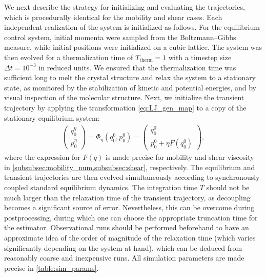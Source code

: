 \documentclass[11pt]{article}
\theoremstyle{definition}
\begin{document}
We next describe the strategy for initializing and evaluating the trajectories, which is procedurally identical for the mobility and shear cases. Each independent realization of the system is initialized as follows. For the equilibrium control system, initial momenta were sampled from the Boltzmann--Gibbs measure, while initial positions were initialized on a cubic lattice. The system was then evolved for a thermalization time of $T_\mathrm{therm} = 1$ with a timestep size $\Delta t=10^{-3}$ in reduced units. We ensured that the thermalization time was sufficient long to melt the crystal structure and relax the system to a stationary state, as monitored by the stabilization of kinetic and potential energies, and by visual inspection of the molecular structure. Next, we initialize the transient trajectory by applying the transformation \eqref{eq:LJ_gen_map} to a copy of the stationary equilibrium system:
\begin{align}
    \begin{pmatrix}
        q_0^\eta \\ p_0^\eta
    \end{pmatrix}
	 = \Phi_\eta(q_0^0,p_0^0) = 
	\begin{pmatrix}
 	  q_0^0 \\ p_0^0 + \eta F(q_0^0)
 	\end{pmatrix},
 	\label{eq:LJ_gen_map}
\end{align}
where the expression for $F(q)$ is made precise for mobility and shear viscosity in \cref{subsubsec:mobility_num,subsubsec:shear}, respectively. The equilibrium and transient trajectories are then evolved simultaneously according to synchronously coupled standard equilibrium dynamics. The integration time $T$ should not be much larger than the relaxation time of the transient trajectory, as decoupling becomes a significant source of error. Nevertheless, this can be overcome during postprocessing, during which one can choose the appropriate truncation time for the estimator. 
Observational runs should be performed beforehand to have an approximate idea of the order of magnitude of the relaxation time (which varies significantly depending on the system at hand), which can be deduced from reasonably coarse and inexpensive runs. All simulation parameters are made precise in \cref{table:sim_params}.
\end{document}
